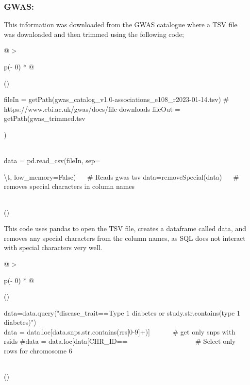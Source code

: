 \documentclass[12pt,a4paper]{article}
\begin{document}
{}

\hypertarget{h.9yfmc6qy2clu}{%
\subsubsection{\texorpdfstring{{GWAS:}}{GWAS:}}\label{h.9yfmc6qy2clu}}

{This information was downloaded from the GWAS catalogue where a TSV
file was downloaded and then trimmed using the following code;}

\protect\hypertarget{t.b1af7d7bc328582cfe763ff0e0cbb9d8bcbeb335}{}{}\protect\hypertarget{t.3}{}{}

\begin{longtable}[]{@{}
  >{\raggedright\arraybackslash}p{(\columnwidth - 0\tabcolsep) * }@{}}
\toprule()
\endhead
\begin{minipage}[t]{\linewidth}\raggedright
{fileIn =
getPath(}{\textquotesingle gwas\_catalog\_v1.0-associations\_e108\_r2023-01-14.tsv\textquotesingle{}}{)
}{\# https://www.ebi.ac.uk/gwas/docs/file-downloads}{\hfill\break
fileOut =
getPath(}{\textquotesingle gwas\_trimmed.tsv\textquotesingle{}}{)\\
\strut \\
data = pd.read\_csv(fileIn,
sep=}{\textquotesingle\textbackslash t\textquotesingle{}}{,
low\_memory=}{False}{) ~ ~}{\# Reads gwas tsv}{\hfill\break
data=removeSpecial(data) ~ ~}{\# removes special characters in column
names}\strut
\end{minipage} \\
\bottomrule()
\end{longtable}

{This code uses pandas to open the TSV file, creates a dataframe called
data, and removes any special characters from the column names, as SQL
does not interact with special characters very well.}

\protect\hypertarget{t.638fb5b406f87bace7364f8ea9275d9a6c56f7f3}{}{}\protect\hypertarget{t.4}{}{}

\begin{longtable}[]{@{}
  >{\raggedright\arraybackslash}p{(\columnwidth - 0\tabcolsep) * }@{}}
\toprule()
\endhead
\begin{minipage}[t]{\linewidth}\raggedright
{data=data.query(}{"disease\_trait==\textquotesingle Type 1
diabetes\textquotesingle{} or study.str.contains(\textquotesingle type 1
diabetes\textquotesingle)"}{)\\
data =
data.loc{[}data.snps.str.contains(}{r\textquotesingle rs{[}0-9{]}+\textquotesingle{}}{){]}
~ ~ ~ ~}{\# get only snps with rsids}{\hfill\break
}{\#data =
data.loc{[}data{[}\textquotesingle CHR\_ID\textquotesingle{]}==\textquotesingle{]}
~ ~ ~ ~ ~ ~ ~ ~ ~ ~ ~ ~\# Select only rows for chromosome 6}\strut
\end{minipage} \\
\bottomrule()
\end{longtable}
\end{document}
